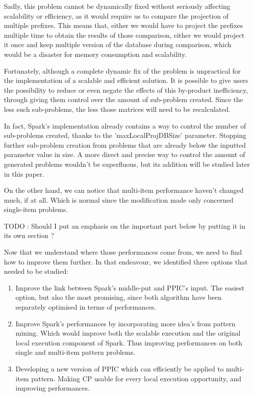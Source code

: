 \documentclass{eplmastersthesis}
\begin{document}
\begin{enumerate}
Sadly, this problem cannot be dynamically fixed without seriously affecting scalability or efficiency, as it would require us to compare the projection of multiple prefixes. This means that, either we would have to project the prefixes multiple time to obtain the results of those comparison, either we would project it once and keep multiple version of the database during comparison, which would be a disaster for memory consumption and scalability.\newline

Fortunately, although a complete dynamic fix of the problem is unpractical for the implementation of a scalable and efficient solution. It is possible to give users the possibility to reduce or even negate the effects of this by-product inefficiency, through giving them control over the amount of sub-problem created. Since the less such sub-problems, the less those matrices will need to be recalculated. \newline

In fact, Spark's implementation already contains a way to control the number of sub-problems created, thanks to the 'maxLocalProjDBSize' parameter. Stopping further sub-problem creation from problems that are already below the inputted parameter value in size. A more direct and precise way to control the amount of generated problems wouldn't be superfluous, but its addition will be studied later in this paper.

\end{enumerate}

On the other hand, we can notice that multi-item performance haven't changed much, if at all. Which is normal since the modification made only concerned single-item problems. \newline

TODO : Should I put an emphasis on the important part below by putting it in its own section ? \newline

Now that we understand where those performances come from, we need to find how to improve them further. In that endeavour, we identified three options that needed to be studied:

\begin{enumerate}
	\item Improve the link between Spark's middle-put and PPIC's input. The easiest option, but also the most promising, since both algorithm have been separately optimised in terms of performances.
	\item Improve Spark's performances by incorporating more idea's from pattern mining.
Which would improve both the scalable execution and the original local execution component of Spark. Thus improving performances on both single and multi-item pattern problems.
	\item Developing a new version of PPIC which can efficiently be applied to multi-item pattern. Making CP usable for every local execution opportunity, and improving performances.
\end{enumerate}
\end{document}
